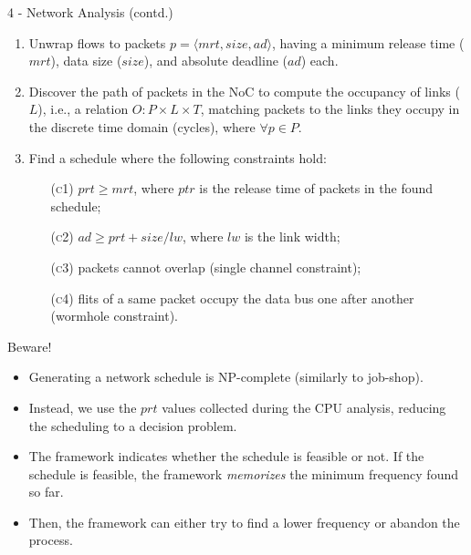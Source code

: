 \begin{frame}{4 - Network Analysis (contd.)}
	
	
	\begin{enumerate}
		\item Unwrap flows to packets $p = \langle mrt, size, ad \rangle$, having a minimum release time ($mrt$), data size ($size$), and absolute deadline ($ad$) each. 
		
		\item Discover the path of packets in the NoC to compute the occupancy of links ($L$), i.e., a relation $O : P \times L \times T$, matching packets to the links they occupy in the discrete time domain (cycles), where $\forall p \in P$. 
		
		\item Find a schedule where the following constraints hold:
		\begin{itemize}
			\item[(\textsc{c1})] $prt \geq mrt$, where $ptr$ is the release time of packets in the found schedule;
			\item[(\textsc{c2})] $ad \geq prt + size / lw$, where $lw$ is the link width;
			\item[(\textsc{c3})] packets cannot overlap (single channel constraint);
			\item[(\textsc{c4})] flits of a same packet occupy the data bus one after another (wormhole constraint). 
			
		\end{itemize}
	\end{enumerate}
\end{frame}

\begin{frame}{Beware!}
	
	\begin{itemize}
		\item Generating a network schedule is NP-complete (similarly to job-shop).
		
		\item Instead, we use the $prt$ values collected during the CPU analysis, reducing the scheduling to a decision problem. 
		
		\item The framework indicates whether the schedule is feasible or not. If the schedule is feasible, the framework \textit{memorizes} the minimum frequency found so far. 
		
		\item Then, the framework can either try to find a lower frequency or abandon the process.%
	\end{itemize}
	
\end{frame}